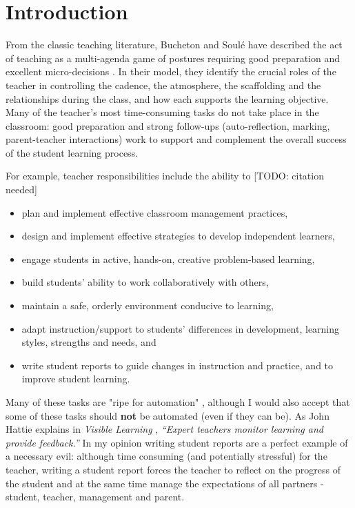 \documentclass[10pt]{article}
\begin{document}
\tableofcontents



\section{Introduction}

From the classic teaching literature, Bucheton and Soulé have described the act of teaching as a multi-agenda game of postures requiring good preparation and excellent micro-decisions \cite{BS09}. In their model, they identify the crucial roles of the teacher in controlling the cadence, the atmosphere, the scaffolding and the relationships during the class, and how each supports the learning objective. Many of the teacher's most time-consuming tasks do not take place in the classroom: good preparation and strong follow-ups (auto-reflection, marking, parent-teacher interactions) work to support and complement the overall success of the student learning process.

For example, teacher responsibilities include the ability to [TODO: citation needed]
\begin{itemize}
\item plan and implement effective classroom management practices,
\item design and implement effective strategies to develop independent learners,
\item engage students in active, hands-on, creative problem-based learning,
\item build students’ ability to work collaboratively with others,
\item maintain a safe, orderly environment conducive to learning,
\item adapt instruction/support to students’ differences in development, learning styles, strengths and needs, and
\item write student reports to guide changes in instruction and practice, and to improve student learning.
\end{itemize}

Many of these tasks are "ripe for automation" \cite[p.? TODO]{Swei15}, although I would also accept that some of these tasks should \textbf{not} be automated (even if they can be). As John Hattie explains in \emph{Visible Learning} \cite{Hat12}, \emph{``Expert teachers monitor learning and provide feedback.''} In my opinion writing student reports are a perfect example of a necessary evil: although time consuming (and potentially stressful) for the teacher, writing a student report forces the teacher to reflect on the progress of the student and at the same time manage the expectations of all partners - student, teacher, management and parent.
\end{document}
